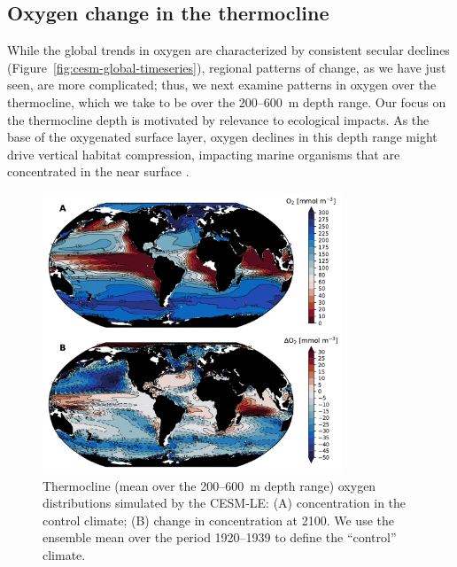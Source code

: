 \documentclass[draft,linenumbers]{report_chapter}
\begin{document}
\subsection{Oxygen change in the thermocline}

While the global trends in oxygen are characterized by consistent secular declines (Figure~\ref{fig:cesm-global-timeseries}), regional patterns of change, as we have just seen, are more complicated; thus, we next examine patterns in oxygen over the thermocline, which we take to be over the 200--600~m depth range.
Our focus on the thermocline depth is motivated by relevance to ecological impacts.
As the base of the oxygenated surface layer, oxygen declines in this depth range might drive vertical habitat compression, impacting marine organisms that are concentrated in the near surface \citep{Stramma-Prince-etal-2011,Deutsch-Ferrel-etal-2015}.

\begin{figure}[tbp]
\centering
\includegraphics[width=0.8\textwidth]{cesm-thermocline-o2-change.pdf}
\caption{Thermocline (mean over the 200--600~m depth range) oxygen distributions simulated by the CESM-LE: (A)  concentration in the control climate; (B) change in  concentration at 2100.
We use the ensemble mean over the period 1920--1939 to define the ``control'' climate.}
\label{fig:cesm-thermocline-o2-change}
\end{figure}
\end{document}
